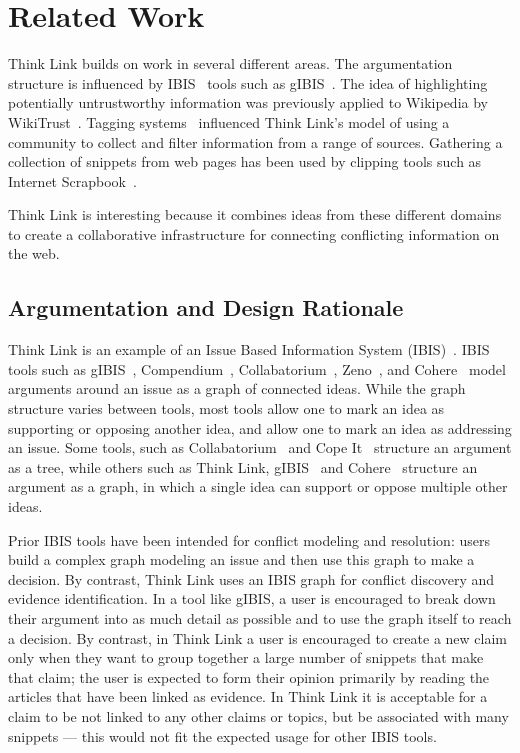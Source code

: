 \documentclass{chi2009}
\newcommand{\todo}[1]{}
\begin{document}
\section{Related Work}
\todo{Don't cite things that aren't relevant}

Think Link builds on work in several different areas. 
The argumentation structure is influenced by IBIS~\cite{Rittel1973} tools such as gIBIS~\cite{Conklin1987a}.  %
The idea of highlighting potentially untrustworthy information was previously applied to Wikipedia by WikiTrust~\cite{Adler2008a}.   %
Tagging systems~\cite{Marlow2006} influenced Think Link's model of using a community to collect and filter information from a range of sources. %
Gathering a collection of snippets from web pages has been used by clipping tools such as Internet Scrapbook~\cite{Sugiura1998}.  %

Think Link is interesting because it combines ideas from these different domains to create a collaborative infrastructure for connecting conflicting information on the web.  %

\subsection{Argumentation and Design Rationale}

Think Link is an example of an Issue Based Information System (IBIS)~\cite{Rittel1973}. IBIS tools such as gIBIS~\cite{Conklin1987a}, Compendium~\cite{Selvin2001}, Collabatorium~\cite{Klein2007}, Zeno~\cite{Gordon1997}, and Cohere~\cite{Shum2008} model arguments around an issue as a graph of connected ideas. While the graph structure varies between tools, most tools allow one to mark an idea as supporting or opposing another idea, and allow one to mark an idea as addressing an issue. Some tools, such as Collabatorium~\cite{Klein2007} and Cope It~\cite{Karacapilidis2006} structure an argument as a tree, while others such as Think Link, gIBIS~\cite{Conklin1987a} and Cohere~\cite{Shum2008} structure an argument as a graph, in which a single idea can support or oppose multiple other ideas.

Prior IBIS tools have been intended for conflict modeling and resolution: users build a complex graph modeling an issue and then use this graph to make a decision.  %
By contrast, Think Link uses an IBIS graph for conflict discovery and evidence identification.  %
In a tool like gIBIS, a user is encouraged to break down their argument into as much detail as possible and to use the graph itself to reach a decision.  %
By contrast, in Think Link a user is encouraged to create a new claim only when they want to group together a large number of snippets that make that claim; the user is expected to form their opinion primarily by reading the articles that have been linked as evidence.  %
In Think Link it is acceptable for a claim to be not linked to any other claims or topics, but be associated with many snippets --- this would not fit the expected usage for other IBIS tools. %
\end{document}
